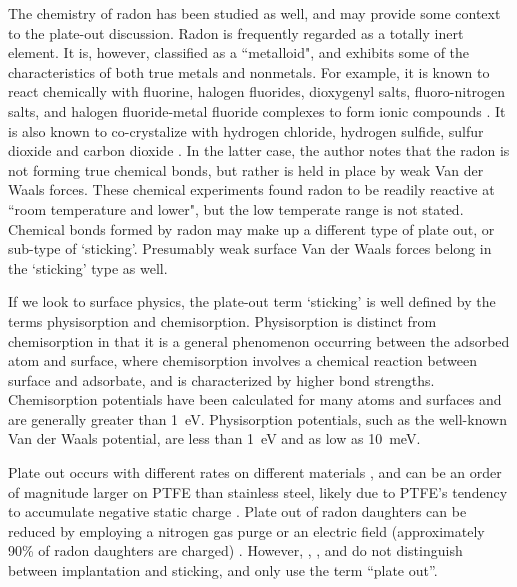 The chemistry of radon has been studied as well, and may provide some context to the plate-out discussion. Radon is frequently regarded as a totally inert element. It is, however, classified as a ``metalloid", and exhibits some of the characteristics of both true metals and nonmetals. For example, it is known to react chemically with fluorine, halogen fluorides, dioxygenyl salts, fluoro-nitrogen salts, and halogen fluoride-metal fluoride complexes to form ionic compounds \cite{stein1982}. It is also known to co-crystalize with hydrogen chloride, hydrogen sulfide, sulfur dioxide and carbon dioxide \cite{stein1987}. In the latter case, the author notes that the radon is not forming true chemical bonds, but rather is held in place by weak Van der Waals forces. These chemical experiments found radon to be readily reactive at ``room temperature and lower", but the low temperate range is not stated. Chemical bonds formed by radon may make up a different type of plate out, or sub-type of `sticking'. Presumably weak surface Van der Waals forces belong in the `sticking' type as well. 

If we look to surface physics, the plate-out term `sticking' is well defined by the terms physisorption and chemisorption. Physisorption is distinct from chemisorption in that it is a general phenomenon occurring between the adsorbed atom and surface, where chemisorption involves a chemical reaction between surface and adsorbate, and is characterized by higher bond strengths. Chemisorption potentials have been calculated for many atoms and surfaces \cite{HammerNorskov} and are generally greater than 1~eV. Physisorption potentials, such as the well-known Van der Waals potential, are less than 1~eV and as low as 10~meV. 


Plate out occurs with different rates on different materials \cite{Bigu1987}, and can be an order of magnitude larger on PTFE than stainless steel, likely due to PTFE's tendency to accumulate negative static charge \cite{Morrison2017}. Plate out of radon daughters can be reduced by employing a nitrogen gas purge or an electric field (approximately 90\% of radon daughters are charged) \cite{Bruemmer2015}. However, \cite{Bigu1987}, \cite{Morrison2017}, and \cite{Bruemmer2015} do not distinguish between implantation and sticking, and only use the term ``plate out''. 


